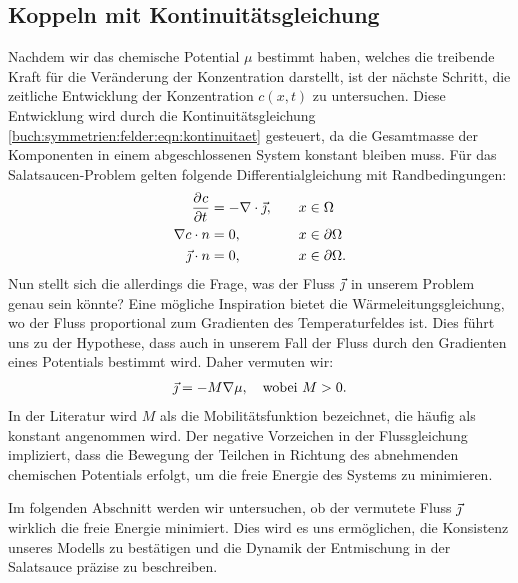 \subsection{Koppeln mit Kontinuitätsgleichung}
Nachdem wir das chemische Potential $\mu$ bestimmt haben,
welches die treibende Kraft für die Veränderung der Konzentration darstellt,
ist der nächste Schritt,
die zeitliche Entwicklung der Konzentration $c(x,t)$ zu untersuchen.
Diese Entwicklung wird durch die Kontinuitätsgleichung
\eqref{buch:symmetrien:felder:eqn:kontinuitaet} gesteuert,
da die Gesamtmasse der Komponenten in einem abgeschlossenen System konstant bleiben muss.
Für das Salatsaucen-Problem gelten folgende Differentialgleichung mit Randbedingungen:
\begin{align}
\begin{aligned}
\frac{\partial^{} c}{\partial t^{}}
&=
- \nabla \cdot {\vec{\jmath}}
,\quad&
x &\in \Omega
\\
\nabla c \cdot n
&=
0
,&
x &\in \partial\Omega
\\
{\vec{\jmath}} \cdot n
&=
0
,&
x &\in \partial\Omega
.
\end{aligned}
\label{cahnhilliard:continuity}
\end{align}
Nun stellt sich die allerdings die Frage,
was der Fluss ${\vec{\jmath}}$ \;in unserem Problem genau sein könnte?
Eine mögliche Inspiration bietet die Wärmeleitungsgleichung,
wo der Fluss proportional zum Gradienten des Temperaturfeldes ist.
Dies führt uns zu der Hypothese, dass auch in unserem Fall der Fluss
durch den Gradienten eines Potentials bestimmt wird.
Daher vermuten wir:
\begin{align*}
{\vec{\jmath}}
=
- M \nabla \mu
,\quad\text{wobei } M > 0
.
\end{align*}
In der Literatur wird $M$ als die Mobilitätsfunktion bezeichnet,
die häufig als konstant angenommen wird.
Der negative Vorzeichen in der Flussgleichung impliziert,
dass die Bewegung der Teilchen in Richtung des abnehmenden chemischen Potentials erfolgt,
um die freie Energie des Systems zu minimieren.

Im folgenden Abschnitt werden wir untersuchen,
ob der vermutete Fluss ${\vec{\jmath}}{}$ \;wirklich die freie Energie minimiert.
Dies wird es uns ermöglichen,
die Konsistenz unseres Modells zu bestätigen und
die Dynamik der Entmischung in der Salatsauce präzise zu beschreiben.

